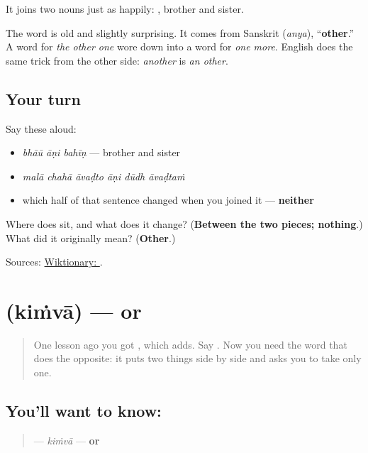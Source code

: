 It joins two nouns just as happily: \textbf{  }, brother and sister.

The word is old and slightly surprising. It comes from Sanskrit \textbf{} (\emph{anya}), \textquotedblleft{}\textbf{other}.\textquotedblright{} A word for \emph{the other one} wore down into a word for \emph{one more}. English does the same trick from the other side: \emph{another} is \emph{an other}.

\subsection*{Your turn}
Say these aloud:

\begin{itemize}
\raggedright
  \item \emph{bhāū āṇi bahīṇ} — brother and sister
  \item \emph{malā chahā āvaḍto āṇi dūdh āvaḍtaṁ}
  \item which half of that sentence changed when you joined it — \textbf{neither}
\end{itemize}

\begin{tcolorbox}[breakable,colback=teal!4,colframe=teal!35!black,title={Before you move on}]
Where does \textbf{} sit, and what does it change? (\textbf{Between the two pieces; nothing}.) What did it originally mean? (\textbf{Other}.)

Sources: \href{https://en.wiktionary.org/wiki/\%E0\%A4\%86\%E0\%A4\%A3\%E0\%A4\%BF}{Wiktionary: }.
\end{tcolorbox}
\section[\texorpdfstring{\mr{किंवा} (kiṁvā)}{किंवा (kiṁvā)}]{ (kiṁvā) — or}

\label{lesson:MR-C30-kinva}



\begin{quote}
One lesson ago you got \textbf{}, which adds. Say \textbf{  }. Now you need the word that does the opposite: it puts two things side by side and asks you to take only one.
\end{quote}

\subsection*{You'll want to know: }
\begin{quote}
\textbf{} — \emph{kiṁvā} — \textbf{or}
\end{quote}

